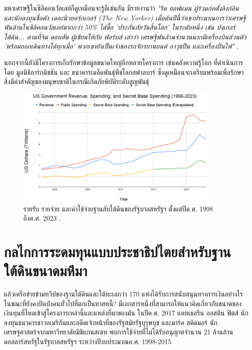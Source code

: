 \documentclass[10pt,twocolumn,letterpaper]{article}
\begin{document}
มหาเศรษฐีในซิลิคอนวัลเลย์ก็ดูเหมือนจะรู้ดีเช่นกัน มีรายงานว่า \textit{"รีด ฮอฟแมน ผู้ร่วมก่อตั้งลิงก์อิน และนักลงทุนชื่อดัง เดอะนิวยอร์กเกอร์ (The New Yorker) เมื่อต้นปีนี้ว่าเขาประมาณการว่าเศรษฐีพันล้านในซิลิคอนวัลเลย์มากกว่า 50\% ได้ซื้อ 'ประกันภัยวันสิ้นโลก' ในระดับหนึ่ง เช่น บังเกอร์ใต้ดิน... ตามที่จิม ดอบสัน ผู้เขียนให้กับ ฟอร์บส์ เล่าว่า เศรษฐีพันล้านจำนวนมากมีเครื่องบินส่วนตัว 'พร้อมออกเดินทางได้ทุกเมื่อ' พวกเขายังเป็นเจ้าของรถจักรยานยนต์ อาวุธปืน และเครื่องปั่นไฟ"} \cite{28}.

นอกจากนี้ยังมีโครงการเก็บรักษาข้อมูลขนาดใหญ่อีกหลายโครงการ เช่นคลังความรู้โลก ที่ดำเนินการโดย มูลนิธิอาร์กมิชชัน \cite{29} และ ธนาคารเมล็ดพันธุ์พืชโลกสฟาลบาร์\cite{30} ซึ่งดูเหมือนจะเตรียมพร้อมเพื่อรักษาสิ่งมีค่าสำคัญของมนุษยชาติในกรณีเกิดภัยพิบัติระดับสูญพันธุ์
\begin{figure}[t]
\begin{center}
\includegraphics[width=0.9\textwidth]{govcrop2.png}
\end{center}
   \caption{รายรับ รายจ่าย และค่าใช้จ่ายฐานลับใต้ดินของรัฐบาลสหรัฐฯ ตั้งแต่ปีค.ศ. 1998 ถึงค.ศ. 2023 \cite{19}.}
   \label{fig:9}
\end{figure}
\section{กลไกการระดมทุนแบบประชาธิปไตยสำหรับฐานใต้ดินขนาดมหึมา}

แล้วเครือข่ายข้ามทวีปของฐานใต้ดินและใต้ทะเลกว่า 170 แห่งได้รับการสนับสนุนทางการเงินอย่างไร ในขณะที่ยังคงปิดบังคนทั่วไปที่ตกเป็นทาสหนี้? มีเอกสารหนึ่งที่สามารถให้แนวคิดเกี่ยวกับขนาดของเงินทุนที่ไหลเข้าสู่โครงการเหล่านี้และแหล่งที่มาของมัน ในปีค.ศ. 2017 แคทเธอรีน ออสติน ฟิตส์ นักลงทุนธนาคารชาวอเมริกันและอดีตเจ้าหน้าที่ของรัฐสมัยรัฐบุรุษบุช และมาร์ค สคิดมอร์ นักเศรษฐศาสตร์จากมหาวิทยาลัยมิชิแกนสเตท พบการใช้จ่ายที่ไม่ได้รับอนุญาตจำนวน 21 ล้านล้านดอลลาร์สหรัฐในรัฐบาลสหรัฐฯ ระหว่างปีงบประมาณค.ศ. 1998-2015 \cite{11,12,13}
\end{document}
